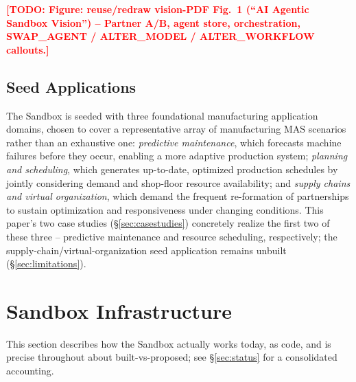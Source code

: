 \documentclass[10pt,conference]{IEEEtran}
\newcommand{\todo}[1]{\textcolor{red}{\textbf{[TODO: #1]}}}
\begin{document}
\todo{Figure: reuse/redraw vision-PDF Fig.~1 (``AI Agentic Sandbox
Vision'') -- Partner A/B, agent store, orchestration, SWAP\_AGENT /
ALTER\_MODEL / ALTER\_WORKFLOW callouts.}

\subsection{Seed Applications}
\label{sec:seedapps}
The Sandbox is seeded with three foundational manufacturing application
domains, chosen to cover a representative array of manufacturing MAS
scenarios rather than an exhaustive one: \emph{predictive maintenance},
which forecasts machine failures before they occur, enabling a more adaptive
production system; \emph{planning and scheduling}, which generates
up-to-date, optimized production schedules by jointly considering demand and
shop-floor resource availability; and \emph{supply chains and virtual
organization}, which demand the frequent re-formation of partnerships to
sustain optimization and responsiveness under changing conditions. This
paper's two case studies (\S\ref{sec:casestudies}) concretely realize the
first two of these three -- predictive maintenance and resource scheduling,
respectively; the supply-chain/virtual-organization seed application remains
unbuilt (\S\ref{sec:limitations}).

\section{Sandbox Infrastructure}
\label{sec:infra}
This section describes how the Sandbox actually works today, as code, and is
precise throughout about built-vs-proposed; see \S\ref{sec:status} for a
consolidated accounting.
\end{document}
